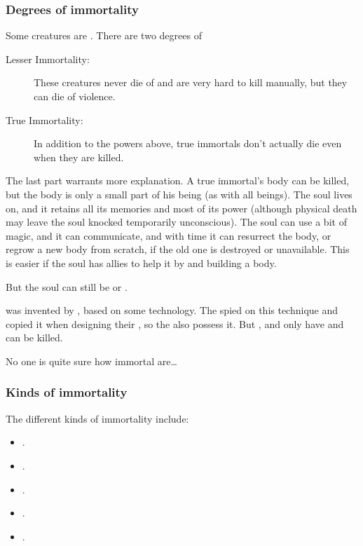 \subsubsection{Degrees of immortality}
Some creatures are . 
There are two degrees of 

\begin{description}
  \item[Lesser Immortality:] 
    These creatures never die of  and are very hard to kill manually, but they can die of violence. 
  \item[True Immortality:]
    In addition to the powers above, true immortals don't actually die even when they are killed. 
\end{description}

The last part warrants more explanation. 
A true immortal's body can be killed, but the body is only a small part of his being (as with all beings). 
The soul lives on, and it retains all its memories and most of its power (although physical death may leave the soul knocked temporarily unconscious). 
The soul can use a bit of magic, and it can communicate, and with time it can resurrect the body, or regrow a new body from scratch, if the old one is destroyed or unavailable. 
This is easier if the soul has allies to help it by  and building a body. 

But the soul can still be  or . 

 was invented by \TyarithXserasshana, based on some \xsic{} technology. 
The \banelords{} spied on this technique and copied it when designing their \resphain, so the \resphain{} also possess it. 
But \quiljaaran, \vorcanths{} and \aryothim{} only have  and can be killed. 

No one is quite sure how immortal \banes{} are\ldots{}





\subsubsection{Kinds of immortality}
The different kinds of immortality include: 
\begin{itemize}
  \item {}. 
  \item {}. 
  \item {}. 
  \item {}. 
  \item {}. 
\end{itemize}









